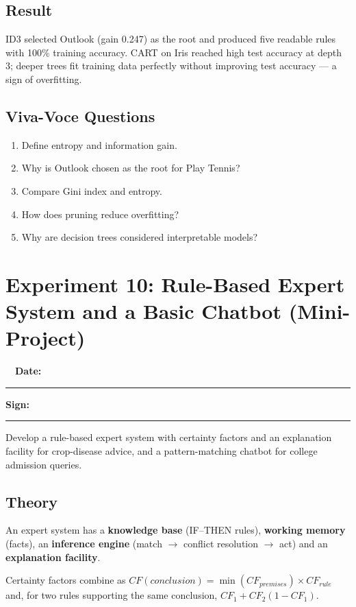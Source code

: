 \documentclass[11pt]{article}
\begin{document}
\subsection*{Result}
\begin{outcome}ID3 selected Outlook (gain 0.247) as the root and produced five readable rules with 100\% training accuracy. CART on Iris reached high test accuracy at depth 3; deeper trees fit training data perfectly without improving test accuracy --- a sign of overfitting.\end{outcome}
\subsection*{Viva-Voce Questions}
\begin{enumerate}
\item Define entropy and information gain.
\item Why is Outlook chosen as the root for Play Tennis?
\item Compare Gini index and entropy.
\item How does pruning reduce overfitting?
\item Why are decision trees considered interpretable models?
\end{enumerate}
\newpage
\section*{Experiment 10: Rule-Based Expert System and a Basic Chatbot (Mini-Project)}\label{exp10}
\noindent{}\ \ \hfill\textbf{\color{navy}Date:}\ \rule{3cm}{0.4pt}\quad\textbf{\color{navy}Sign:}\ \rule{3cm}{0.4pt}\par\medskip
\begin{keypoint}[Aim]Develop a rule-based expert system with certainty factors and an explanation facility for crop-disease advice, and a pattern-matching chatbot for college admission queries.\end{keypoint}
\subsection*{Theory}
An expert system has a \textbf{knowledge base} (IF--THEN rules), \textbf{working memory} (facts), an \textbf{inference engine} (match $\to$ conflict resolution $\to$ act) and an \textbf{explanation facility}.

Certainty factors combine as $CF(conclusion)=\min(CF_{premises})\times CF_{rule}$ and, for two rules supporting the same conclusion, $CF_1+CF_2(1-CF_1)$.
\end{document}
